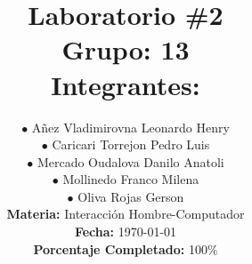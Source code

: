 
\newcommand{\NumeroLaboratorio}{2}		%
\newcommand{\PorcentajeCompletado}{100}	%





\title{
\hspace{-0.1cm}\LARGE{Laboratorio \#\NumeroLaboratorio} \\\vspace{0.05cm}
{\large Grupo: 13} \\\vspace{0.2cm}
{\large Integrantes:} \\\vspace{0.2cm}
}

\author{
\hspace{0.5cm}$\bullet$ Añez Vladimirovna Leonardo Henry\\
\hspace{0.5cm}$\bullet$ Caricari Torrejon Pedro Luis\\
\hspace{0.5cm}$\bullet$ Mercado Oudalova Danilo Anatoli\\
\hspace{0.5cm}$\bullet$ Mollinedo Franco Milena\\
\hspace{0.5cm}$\bullet$ Oliva Rojas Gerson \\\vspace{0.2cm}
\textbf{Materia:} Interacción Hombre-Computador \\\vspace{0.2cm}
\textbf{Fecha:} \today \\\vspace{0.2cm}
\textbf{Porcentaje Completado:} \PorcentajeCompletado$\%$
}
\maketitle